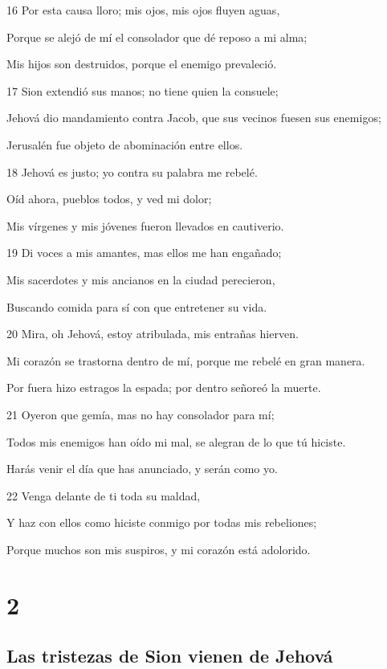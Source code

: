 \par 16 Por esta causa lloro; mis ojos, mis ojos fluyen aguas,
\par Porque se alejó de mí el consolador que dé reposo a mi alma;
\par Mis hijos son destruidos, porque el enemigo prevaleció.
\par 17 Sion extendió sus manos; no tiene quien la consuele;
\par Jehová dio mandamiento contra Jacob, que sus vecinos fuesen sus enemigos;
\par Jerusalén fue objeto de abominación entre ellos.
\par 18 Jehová es justo; yo contra su palabra me rebelé.
\par Oíd ahora, pueblos todos, y ved mi dolor;
\par Mis vírgenes y mis jóvenes fueron llevados en cautiverio.
\par 19 Di voces a mis amantes, mas ellos me han engañado;
\par Mis sacerdotes y mis ancianos en la ciudad perecieron,
\par Buscando comida para sí con que entretener su vida.
\par 20 Mira, oh Jehová, estoy atribulada, mis entrañas hierven.
\par Mi corazón se trastorna dentro de mí, porque me rebelé en gran manera.
\par Por fuera hizo estragos la espada; por dentro señoreó la muerte.
\par 21 Oyeron que gemía, mas no hay consolador para mí;
\par Todos mis enemigos han oído mi mal, se alegran de lo que tú hiciste.
\par Harás venir el día que has anunciado, y serán como yo.
\par 22 Venga delante de ti toda su maldad,
\par Y haz con ellos como hiciste conmigo por todas mis rebeliones;
\par Porque muchos son mis suspiros, y mi corazón está adolorido.

\chapter{2}

\section*{Las tristezas de Sion vienen de Jehová}

